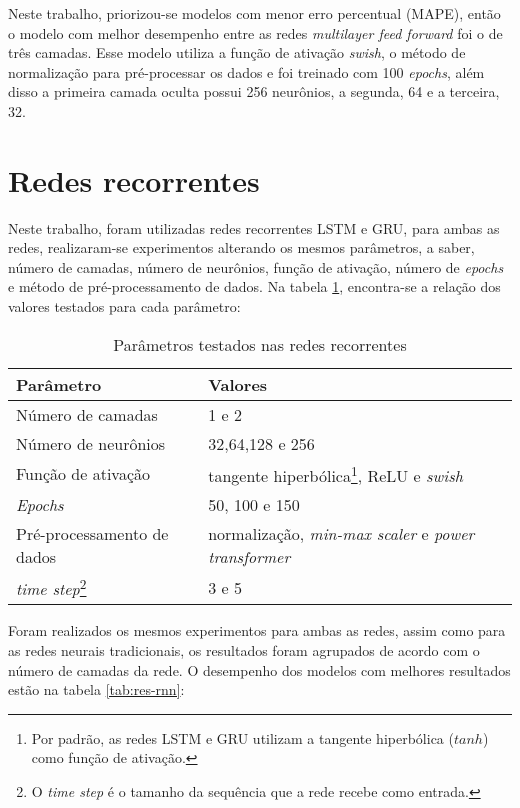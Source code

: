 Neste trabalho, priorizou-se modelos com menor erro percentual (MAPE), então 
o modelo com melhor desempenho entre as redes \textit{multilayer feed forward}
foi o de três camadas. Esse modelo utiliza a função de ativação \textit{swish},
o método de normalização para pré-processar os dados e foi treinado com 100 
\textit{epochs}, além disso a primeira camada oculta possui 256 neurônios, a 
segunda, 64 e a terceira, 32.

\section{Redes recorrentes}

Neste trabalho, foram utilizadas redes recorrentes LSTM e GRU, para ambas as 
redes, realizaram-se experimentos alterando os mesmos parâmetros, a saber,
número de camadas, número de neurônios, função de ativação, número de \textit{epochs}
e método de pré-processamento de dados. Na tabela \ref{tab:param-rnn}, encontra-se 
a relação dos valores testados para cada parâmetro:

\begin{table}[H]
    \centering
    \begin{tabular}{ll}
        \toprule
        Parâmetro           & Valores   \\
        \midrule
        Número de camadas   & 1 e 2 \\
        Número de neurônios & 32,64,128 e 256       \\
        Função de ativação  & tangente hiperbólica\footnote{Por padrão, as redes LSTM e GRU utilizam a tangente hiperbólica ($tanh$) como função de ativação.}, ReLU e \textit{swish}  \\
        \textit{Epochs}              & 50, 100 e 150      \\
        Pré-processamento de dados & normalização, \textit{min-max scaler} e \textit{power transformer}\\
        \textit{time step}\footnote{O \textit{time step} é o tamanho da sequência que a rede recebe como entrada.}  & 3 e 5 \\
        \bottomrule
    \end{tabular}
    \caption{Parâmetros testados nas redes recorrentes}
    \label{tab:param-rnn}
\end{table} 

Foram realizados os mesmos experimentos para ambas as redes, assim como para 
as redes neurais tradicionais, os resultados foram agrupados de acordo com 
o número de camadas da rede. O desempenho dos modelos com melhores resultados 
estão na tabela \ref{tab:res-rnn}:

